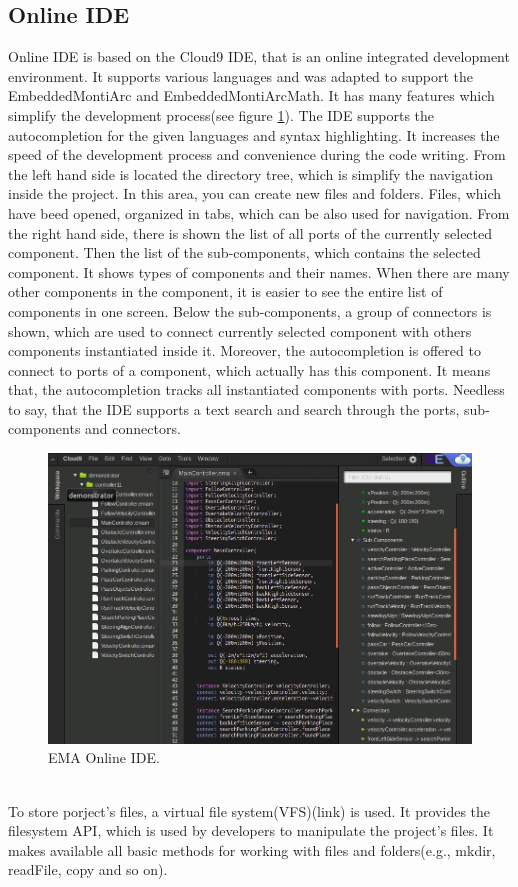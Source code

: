 \subsection{Online IDE} \label{sec:onlineide}
Online IDE is based on the Cloud9 IDE, that is an online integrated development environment. It supports various languages and was adapted to support the EmbeddedMontiArc and EmbeddedMontiArcMath. It has many features which simplify the development process(see figure \ref{fig:onlineIDE}). The IDE supports the autocompletion for the given languages and syntax highlighting. It increases the speed of the development process and convenience during the code writing. From the left hand side is located the directory tree, which is simplify the navigation inside the project. In this area, you can create new files and folders. Files, which have beed opened, organized in tabs, which can be also used for navigation. From the right hand side, there is shown the list of all ports of the currently selected component. Then the list of the sub-components, which contains the selected component. It shows types of components and their names. When there are many other components in the component, it is easier to see the entire list of components in one screen. Below the sub-components, a group of connectors is shown, which are used to connect currently selected component with others components instantiated inside it. Moreover, the autocompletion is offered to connect to ports of a component, which actually has this component. It means that, the autocompletion tracks all instantiated components with ports. Needless to say, that the IDE supports a text search and search through the ports, sub-components and connectors.
\begin{figure}[h!]
    \centering
    \includegraphics[width=\linewidth]{src/pic/onlineIDE}
    \caption{EMA Online IDE.}
    \label{fig:onlineIDE}
\end{figure} \\
To store porject's files, a virtual file system(VFS)(link) is used. It provides the filesystem API, which is used by developers to manipulate the project's files. It makes available all basic methods for working with files and folders(e.g., mkdir, readFile, copy and so on).
